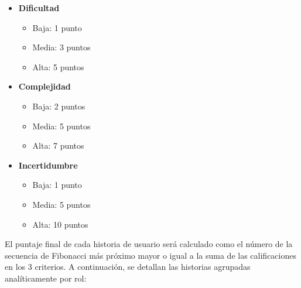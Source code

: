 \documentclass[
11pt, %
]{charter}
\begin{document}
\begin{itemize}

    \item \textbf{Dificultad}
    \begin{itemize}
        \item Baja: 1 punto
        \item Media: 3 puntos
        \item Alta: 5 puntos
    \end{itemize}

    \item \textbf{Complejidad}
    \begin{itemize}
        \item Baja: 2 puntos
        \item Media: 5 puntos
        \item Alta: 7 puntos
    \end{itemize}

    \item \textbf{Incertidumbre}
    \begin{itemize}
        \item Baja: 1 punto
        \item Media: 5 puntos
        \item Alta: 10 puntos
    \end{itemize}

\end{itemize}

El puntaje final de cada historia de usuario será calculado como el número de la secuencia de Fibonacci más próximo mayor o igual a la suma de las calificaciones en los 3 criterios. A continuación, se detallan las historias agrupadas analíticamente por rol:
\end{document}
